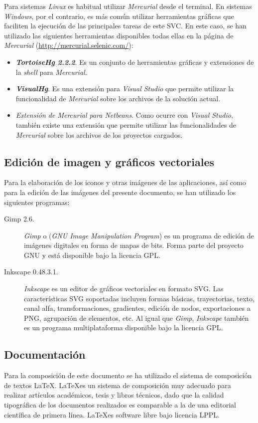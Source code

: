   Para sistemas \emph{Linux} es habitual utilizar \emph{Mercurial} desde el
  terminal. En sistemas \emph{Windows}, por el contrario, es más común utilizar
  herramientas gráficas que faciliten la ejecución de las principales tareas
  de este \acs{SVC}. En este caso, se han utilizado las siguientes herramientas
  disponibles todas ellas en la página de \emph{Mercurial}
  (\url{http://mercurial.selenic.com/}):
  \begin{itemize}
    \item \emph{\textbf{TortoiseHg 2.2.2}}. Es un conjunto de herramientas 
    gráficas y extensiones de la \emph{shell} para \emph{Mercurial}.
    \item \emph{\textbf{VisualHg}}. Es una extensión para \emph{Visual Studio}
    que permite utilizar la funcionalidad de \emph{Mercurial} sobre los
    archivos de la solución actual.
    \item \emph{Extensión de Mercurial para Netbeans}. Como ocurre con
    \emph{Visual Studio}, también existe una extensión que permite utilizar
    las funcionalidades de \emph{Mercurial} sobre los archivos de los 
    proyectos cargados.
  \end{itemize}

  \subsection{Edición de imagen y gráficos vectoriales}
  Para la elaboración de los iconos y otras imágenes de las aplicaciones, así
  como para la edición de las imágenes del presente documento, se han utilizado
  los siguientes programas:
  \begin{description}
  \item[Gimp 2.6.] \emph{Gimp} o (\emph{\acs{GNU} Image Manipulation Program})
  es un programa de edición de imágenes digitales en forma de mapas de bits.
  Forma parte del proyecto \acs{GNU} y está disponible bajo la licencia
  \acs{GPL}.
  \item[Inkscape 0.48.3.1.] \emph{Inkscape} es un editor de gráficos 
  vectoriales en formato \acs{SVG}. Las características \acs{SVG} soportadas
  incluyen formas básicas, trayectorias, texto, canal alfa, transformaciones,
  gradientes, edición de nodos, exportaciones a \acs{PNG}, agrupación de
  elementos, etc. Al igual que \emph{Gimp}, \emph{Inkscape} también es un
  programa multiplataforma disponible bajo la licencia \acs{GPL}.
  \end{description}

  \subsection{Documentación}
  Para la composición de este documento se ha utilizado el sistema de
  composición de textos \LaTeX. \LaTeX es un sistema de composición muy
  adecuado para realizar artículos académicos, tesis y libros técnicos, dado
  que la calidad tipográfica de los documentos realizados es comparable a la
  de una editorial científica de primera línea\cite{bib:LaTeX}. \LaTeX es
  software libre bajo licencia \acs{LPPL}.

